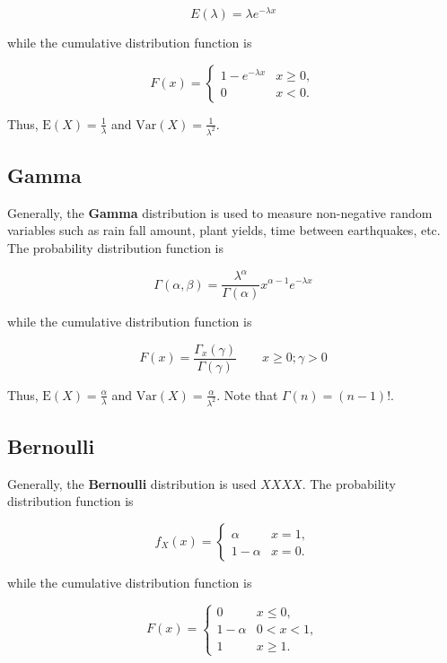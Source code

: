 \documentclass[12pt]{article}
\begin{document}
\begin{equation*}
E(\lambda) = \lambda e^{- \lambda x}
\end{equation*}

\noindent
while the cumulative distribution function is

\[ F(x) =  \begin{cases} 
      1-e^{- \lambda x} & x \geq 0, \\
      0 & x < 0.
      \end{cases} \]

\noindent
Thus, $\text{E}(X) = \frac{1}{\lambda}$ and $\text{Var}(X) = \frac{1}{\lambda^2}$.

\subsection*{Gamma}
\noindent
Generally, the \textbf{Gamma} distribution is used to measure non-negative random variables such as rain fall amount, plant yields, time between earthquakes, etc. The probability distribution function is

\begin{equation*}
\Gamma ( \alpha, \beta) = \frac{\lambda^{\alpha}}{\Gamma(\alpha)} x^{\alpha - 1} e^{- \lambda x}
\end{equation*}

\noindent
while the cumulative distribution function is

\begin{equation*}
F(x) = \frac{\Gamma_x(\gamma)} {\Gamma(\gamma)} \qquad x \geq 0; \gamma > 0
\end{equation*}

\noindent
Thus, $\text{E}(X) = \frac{\alpha}{\lambda}$ and $\text{Var}(X) = \frac{\alpha}{\lambda^2}$. Note that $\Gamma(n) = (n-1)!$.

\subsection*{Bernoulli}
\noindent
Generally, the \textbf{Bernoulli} distribution is used $XXXX$. The probability distribution function is

\[ f_X(x) =  \begin{cases} 
      \alpha & x = 1, \\
      1 - \alpha & x = 0.
      \end{cases} \]

\noindent
while the cumulative distribution function is

\[ F(x) =  \begin{cases} 
      0 & x \leq 0, \\
      1 - \alpha & 0 < x < 1, \\
      1 & x \geq 1.
      \end{cases} \]
      
\end{document}
